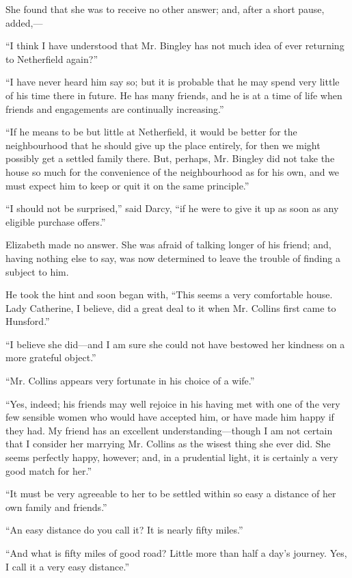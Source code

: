 \documentclass[10pt]{book}
\begin{document}
   She found that she was to receive no other answer; and, after a short
pause, added,—
  

   “I think I have understood that Mr. Bingley has not much idea of ever
returning to Netherfield again?”
  

   “I have never heard him say so; but it is probable that he may spend
very little of his time there in future. He has many friends, and he is
at a time of life when friends and engagements are continually
increasing.”
  

   “If he means to be but little at Netherfield, it would be better for the
neighbourhood that he should give up the place entirely, for then we
might possibly get a settled family there. But, perhaps, Mr. Bingley did
not take the
   house so much for the convenience of the neighbourhood as
for his own, and we must expect him to keep or quit it on the same
principle.”
  

   “I should not be surprised,” said Darcy, “if he were to give it up as
soon as any eligible purchase offers.”
  

   Elizabeth made no answer. She was afraid of talking longer of his
friend; and, having nothing else to say, was now determined to leave the
trouble of finding a subject to him.
  

   He took the hint and soon began with, “This seems a very comfortable
house. Lady Catherine, I believe, did a great deal to it when Mr.
Collins first came to Hunsford.”
  

   “I believe she did—and I am sure she could not have bestowed her
kindness on a more grateful object.”
  

   “Mr. Collins appears very fortunate in his choice of a wife.”
  

   “Yes, indeed; his friends may well rejoice in his having met with one of
the very few sensible women who would have accepted him, or have made
him happy if they had. My friend has an excellent understanding—though
I am not certain that I consider her marrying Mr. Collins as the wisest
thing she ever did. She seems perfectly happy, however; and, in a
prudential light, it is certainly a very good match for her.”
  

   “It must be very agreeable to her to be settled within so easy a
distance of her own family and friends.”
  

   “An easy distance do you call it? It is nearly fifty miles.”
  

   “And what is fifty miles of good road? Little more than half a day’s
journey. Yes, I call it a very easy distance.”
  
\end{document}
